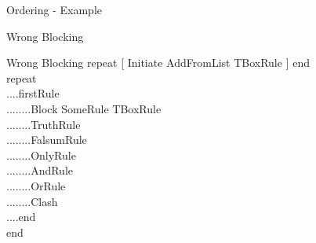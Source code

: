 \documentclass{beamer}
\begin{document}
\begin{frame}{Ordering - Example}

\begin{table}[h]
\begin{center}


\end{center}
\end{table}

\end{frame}




\begin{frame}{Wrong Blocking}

\begin{block}{Wrong Blocking}
repeat [ Initiate AddFromList TBoxRule ] end\\
repeat\\
....firstRule\\
........Block SomeRule TBoxRule\\
........TruthRule\\
........FalsumRule\\
........OnlyRule\\
........AndRule\\
........OrRule\\
........Clash\\
....end\\
end
\end{block}

\end{frame}

\end{document}
